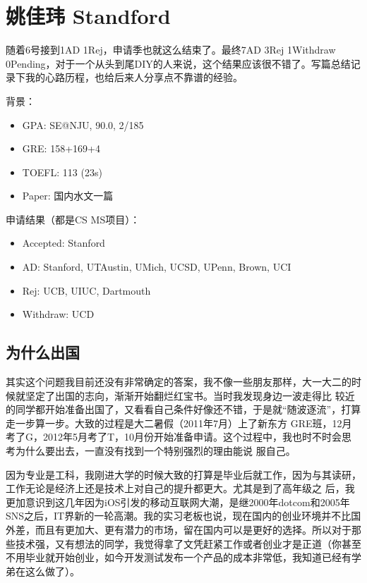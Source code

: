 \section{姚佳玮 Standford}
随着6号接到1AD 1Rej，申请季也就这么结束了。最终7AD 3Rej 1Withdraw 0Pending，对于一个从头到尾DIY的人来说，这个结果应该很不错了。写篇总结记录下我的心路历程，也给后来人分享点不靠谱的经验。\par

背景：
\begin{itemize}
\item GPA: SE@NJU, 90.0, 2/185
\item GRE: 158+169+4
\item TOEFL: 113 (23s)
\item Paper: 国内水文一篇
\end{itemize}
\par
申请结果（都是CS MS项目）：
\begin{itemize}
\item Accepted: Stanford
\item AD: Stanford, UTAustin, UMich, UCSD, UPenn, Brown, UCI
\item Rej: UCB, UIUC, Dartmouth
\item Withdraw: UCD
\end{itemize}
\par
\subsection{为什么出国}
其实这个问题我目前还没有非常确定的答案，我不像一些朋友那样，大一大二的时候就坚定了出国的志向，渐渐开始翻烂红宝书。当时我发现身边一波走得比 较近的同学都开始准备出国了，又看看自己条件好像还不错，于是就“随波逐流”，打算走一步算一步。大致的过程是大二暑假（2011年7月）上了新东方 GRE班，12月考了G，2012年5月考了T，10月份开始准备申请。这个过程中，我也时不时会思考为什么要出去，一直没有找到一个特别强烈的理由能说 服自己。\par

因为专业是工科，我刚进大学的时候大致的打算是毕业后就工作，因为与其读研，工作无论是经济上还是技术上对自己的提升都更大。尤其是到了高年级之 后，我更加意识到这几年因为iOS引发的移动互联网大潮，是继2000年dotcom和2005年SNS之后，IT界新的一轮高潮。我的实习老板也说，现在国内的创业环境并不比国外差，而且有更加大、更有潜力的市场，留在国内可以是更好的选择。所以对于那些技术强，又有想法的同学，我觉得拿了文凭赶紧工作或者创业才是正道（你甚至不用毕业就开始创业，如今开发测试发布一个产品的成本非常低，我知道已经有学弟在这么做了）。\par


